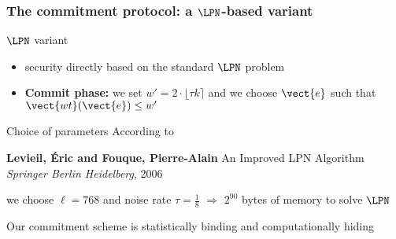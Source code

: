 \begin{frame}
\frametitle{The commitment protocol: a $\LPN$-based variant}
\begin{block}{$\LPN$ variant}
\begin{itemize}
 \item security directly based on the standard $\LPN$ problem
 \item \textbf{Commit phase:} we set $w'= 2 \cdot \lfloor\tau k\rceil$ and we choose $\vect{e}$ such that $\vect{wt}(\vect{e}) \leq w'$
 \end{itemize}

\end{block}


\begin{block}{Choice of parameters}
According to
\begin{center}
\begin{thebibliography}{XX}
   			 \textbf{Levieil, \'Eric and Fouque, Pierre-Alain}
  			 \newblock An Improved LPN Algorithm
   				\newblock \emph{Springer Berlin Heidelberg}, 2006
			\end{thebibliography} 
\end{center}

we choose $\ell=768$ and noise rate $\tau = \frac{1}{8}$ $\Rightarrow$ $2^{90}$ bytes of memory to solve $\LPN$
\end{block}

\begin{theorem}
Our commitment scheme is statistically binding and computationally hiding 
\end{theorem}


\end{frame}

